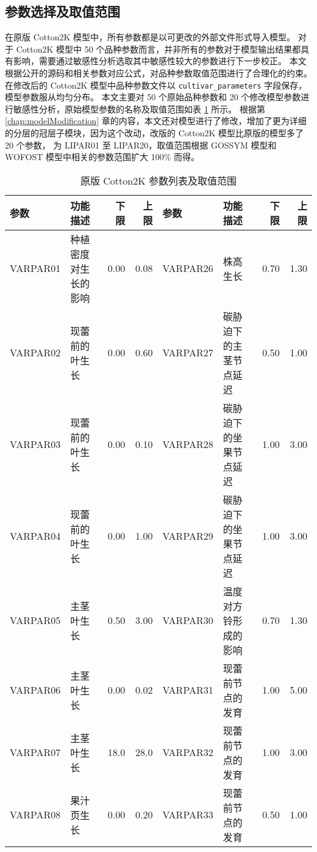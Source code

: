 \begin{spacing}{}
    \section{参数选择及取值范围}
    在原版 Cotton2K 模型中，所有参数都是以可更改的外部文件形式导入模型。%
    对于 Cotton2K 模型中 50 个品种参数而言，并非所有的参数对于模型输出结果都具有影响，需要通过敏感性分析选取其中敏感性较大的参数进行下一步校正。%
    本文根据公开的源码和相关参数对应公式，对品种参数取值范围进行了合理化的约束。%
    在修改后的 Cotton2K 模型中品种参数文件以 \texttt{cultivar\_parameters} 字段保存，模型参数服从均匀分布。%
    本文主要对 50 个原始品种参数和 20 个修改模型参数进行敏感性分析，原始模型参数的名称及取值范围如表 \ref{tab:saParameters} 所示。%
    根据第 \ref{chap:modelModification} 章的内容，本文还对模型进行了修改，增加了更为详细的分层的冠层子模块，因为这个改动，改版的 Cotton2K 模型比原版的模型多了 20 个参数，%
    为 LIPAR01 至 LIPAR20，取值范围根据 GOSSYM 模型和 WOFOST 模型中相关的参数范围扩大 100\% 而得。
    \begin{table}
        \caption{原版 Cotton2K 参数列表及取值范围}\label{tab:saParameters}
        \small
        \begin{tabular}{llrr|llrr}
            \toprule
            参数     & 功能描述             & 下限  & 上限  & 参数     & 功能描述                   & 下限   & 上限   \\
            \midrule
            VARPAR01 & 种植密度对生长的影响 & 0.00  & 0.08  & VARPAR26 & 株高生长                   & 0.70   & 1.30   \\
            VARPAR02 & 现蕾前的叶生长       & 0.00  & 0.60  & VARPAR27 & 碳胁迫下的主茎节点延迟     & 0.50   & 1.00   \\
            VARPAR03 & 现蕾前的叶生长       & 0.00  & 0.10  & VARPAR28 & 碳胁迫下的坐果节点延迟     & 1.00   & 3.00   \\
            VARPAR04 & 现蕾前的叶生长       & 0.00  & 1.00  & VARPAR29 & 碳胁迫下的坐果节点延迟     & 1.00   & 3.00   \\
            VARPAR05 & 主茎叶生长           & 0.50  & 3.00  & VARPAR30 & 温度对方铃形成的影响       & 0.70   & 1.30   \\
            VARPAR06 & 主茎叶生长           & 0.00  & 0.02  & VARPAR31 & 现蕾前节点的发育           & 1.00   & 5.00   \\
            VARPAR07 & 主茎叶生长           & 18.0  & 28.0  & VARPAR32 & 现蕾前节点的发育           & 1.00   & 3.00   \\
            VARPAR08 & 果汁页生长           & 0.00  & 0.20  & VARPAR33 & 现蕾前节点的发育           & 0.50   & 1.00   \\

\end{tabular}
\end{table}
\end{spacing}
